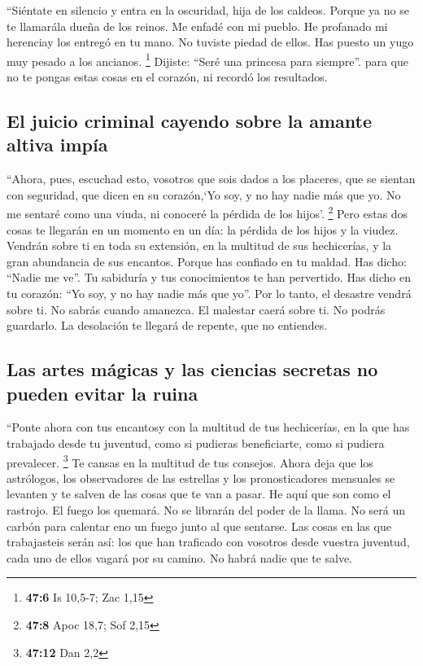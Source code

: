 \begin{paracol}{2}
 ``Siéntate en silencio y entra en la oscuridad, hija de
los caldeos. Porque ya no se te llamarála dueña de los reinos.
 Me enfadé con mi pueblo. He profanado mi herenciay los
entregó en tu mano. No tuviste piedad de ellos. Has puesto un yugo muy
pesado a los ancianos. \footnote{\textbf{47:6} Is 10,5-7; Zac 1,15}
 Dijiste: ``Seré una princesa para siempre''. para que no
te pongas estas cosas en el corazón, ni recordó los resultados.

\hypertarget{el-juicio-criminal-cayendo-sobre-la-amante-altiva-impuxeda}{%
\subsection{El juicio criminal cayendo sobre la amante altiva
impía}\label{el-juicio-criminal-cayendo-sobre-la-amante-altiva-impuxeda}}

 ``Ahora, pues, escuchad esto, vosotros que sois dados a
los placeres, que se sientan con seguridad, que dicen en su corazón,`Yo
soy, y no hay nadie más que yo. No me sentaré como una viuda, ni
conoceré la pérdida de los hijos'. \footnote{\textbf{47:8} Apoc 18,7;
  Sof 2,15}  Pero estas dos cosas te llegarán en un
momento en un día: la pérdida de los hijos y la viudez. Vendrán sobre ti
en toda su extensión, en la multitud de sus hechicerías, y la gran
abundancia de sus encantos.  Porque has confiado en tu
maldad. Has dicho: ``Nadie me ve''. Tu sabiduría y tus conocimientos te
han pervertido. Has dicho en tu corazón: ``Yo soy, y no hay nadie más
que yo''.  Por lo tanto, el desastre vendrá sobre ti. No
sabrás cuando amanezca. El malestar caerá sobre ti. No podrás guardarlo.
La desolación te llegará de repente, que no entiendes.

\hypertarget{las-artes-muxe1gicas-y-las-ciencias-secretas-no-pueden-evitar-la-ruina}{%
\subsection{Las artes mágicas y las ciencias secretas no pueden evitar
la
ruina}\label{las-artes-muxe1gicas-y-las-ciencias-secretas-no-pueden-evitar-la-ruina}}

 ``Ponte ahora con tus encantosy con la multitud de tus
hechicerías, en la que has trabajado desde tu juventud, como si pudieras
beneficiarte, como si pudiera prevalecer. \footnote{\textbf{47:12} Dan
  2,2}  Te cansas en la multitud de tus consejos. Ahora
deja que los astrólogos, los observadores de las estrellas y los
pronosticadores mensuales se levanten y te salven de las cosas que te
van a pasar.  He aquí que son como el rastrojo. El fuego
los quemará. No se librarán del poder de la llama. No será un carbón
para calentar eno un fuego junto al que sentarse.  Las
cosas en las que trabajasteis serán así: los que han traficado con
vosotros desde vuestra juventud, cada uno de ellos vagará por su camino.
No habrá nadie que te salve.


\end{paracol}
